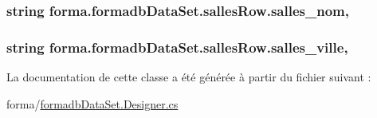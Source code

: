 \subsubsection[{\texorpdfstring{salles\+\_\+nom}{salles_nom}}]{\setlength{\rightskip}{0pt plus 5cm}string forma.\+formadb\+Data\+Set.\+salles\+Row.\+salles\+\_\+nom\hspace{0.3cm}{\ttfamily [get]}, {\ttfamily [set]}}\hypertarget{classforma_1_1formadb_data_set_1_1salles_row_a9ad5b41e31ceeabf166d55017cf22df1}{}\label{classforma_1_1formadb_data_set_1_1salles_row_a9ad5b41e31ceeabf166d55017cf22df1}
\subsubsection[{\texorpdfstring{salles\+\_\+ville}{salles_ville}}]{\setlength{\rightskip}{0pt plus 5cm}string forma.\+formadb\+Data\+Set.\+salles\+Row.\+salles\+\_\+ville\hspace{0.3cm}{\ttfamily [get]}, {\ttfamily [set]}}\hypertarget{classforma_1_1formadb_data_set_1_1salles_row_a66013ab4d6b02d684518187cf893cb22}{}\label{classforma_1_1formadb_data_set_1_1salles_row_a66013ab4d6b02d684518187cf893cb22}


La documentation de cette classe a été générée à partir du fichier suivant \+:\begin{DoxyCompactItemize}
\item 
forma/\hyperlink{formadb_data_set_8_designer_8cs}{formadb\+Data\+Set.\+Designer.\+cs}\end{DoxyCompactItemize}
